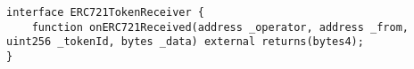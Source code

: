 \begin{lstlisting}[language=Solidity]
interface ERC721TokenReceiver {
	function onERC721Received(address _operator, address _from, uint256 _tokenId, bytes _data) external returns(bytes4);
}
\end{lstlisting}